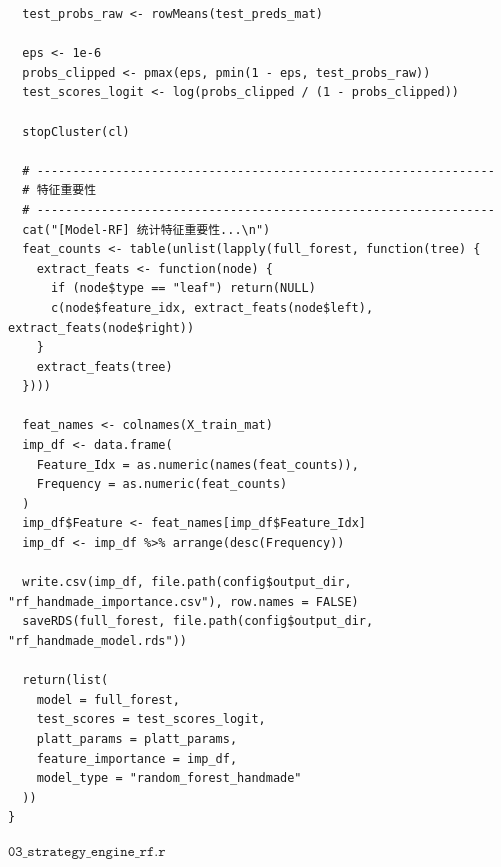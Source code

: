 \documentclass[11pt, a4paper]{article}
\begin{document}
\begin{verbatim}
  test_probs_raw <- rowMeans(test_preds_mat)
  
  eps <- 1e-6
  probs_clipped <- pmax(eps, pmin(1 - eps, test_probs_raw))
  test_scores_logit <- log(probs_clipped / (1 - probs_clipped))
  
  stopCluster(cl)
  
  # ----------------------------------------------------------------
  # 特征重要性
  # ----------------------------------------------------------------
  cat("[Model-RF] 统计特征重要性...\n")
  feat_counts <- table(unlist(lapply(full_forest, function(tree) {
    extract_feats <- function(node) {
      if (node$type == "leaf") return(NULL)
      c(node$feature_idx, extract_feats(node$left), extract_feats(node$right))
    }
    extract_feats(tree)
  })))
  
  feat_names <- colnames(X_train_mat)
  imp_df <- data.frame(
    Feature_Idx = as.numeric(names(feat_counts)),
    Frequency = as.numeric(feat_counts)
  )
  imp_df$Feature <- feat_names[imp_df$Feature_Idx]
  imp_df <- imp_df %>% arrange(desc(Frequency))
  
  write.csv(imp_df, file.path(config$output_dir, "rf_handmade_importance.csv"), row.names = FALSE)
  saveRDS(full_forest, file.path(config$output_dir, "rf_handmade_model.rds"))
  
  return(list(
    model = full_forest,
    test_scores = test_scores_logit,
    platt_params = platt_params,
    feature_importance = imp_df,
    model_type = "random_forest_handmade"
  ))
}
\end{verbatim}
$\texttt{03\_strategy\_engine\_rf.r}$
\end{document}
